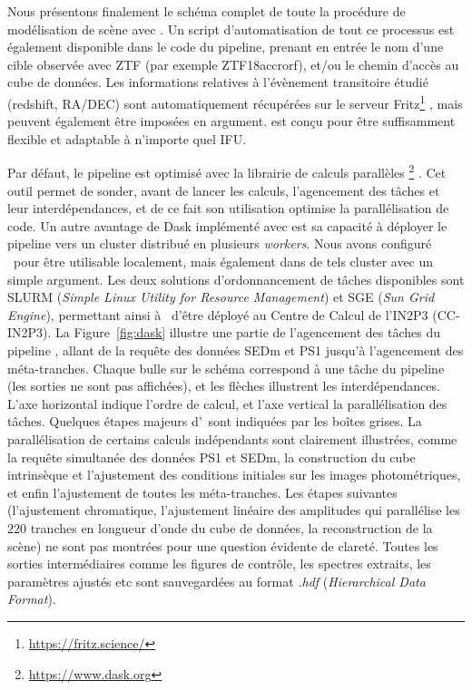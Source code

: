 \documentclass[../main/main.tex]{subfiles}
\begin{document}
Nous présentons finalement le schéma complet de toute la procédure de
modélisation de scène avec \hypergal. Un script d'automatisation de tout
ce processus est également disponible dans le code du pipeline, prenant
en entrée le nom d'une cible observée avec ZTF (par exemple
ZTF18accrorf), et/ou le chemin d'accès au cube de données. Les
informations relatives à l'évènement transitoire étudié (redshift, RA/DEC) sont
automatiquement récupérées sur le serveur
Fritz\footnote{\url{https://fritz.science/}} \citep{skyportal2019,
  duev2019real, Kasliwal_2019, Duev2021}, mais peuvent également être
imposées en argument. \hypergal est conçu pour être suffisamment
flexible et adaptable à n'importe quel IFU.

Par défaut, le pipeline est optimisé avec la librairie de calculs
parallèles \footnote{\url{https://www.dask.org}}
\citep{Dask}. Cet outil permet de sonder, avant de lancer les calculs, l'agencement des
tâches et leur interdépendances, et de ce fait son utilisation optimise la
parallélisation de code. Un autre avantage de Dask implémenté avec
\hypergal est sa capacité à déployer le pipeline vers un cluster
distribué en plusieurs \textit{workers}. Nous avons configuré \hypergal\
pour être utilisable localement, mais également dans de tels cluster
avec un simple argument. Les deux solutions d'ordonnancement de tâches
disponibles sont SLURM (\textit{Simple Linux Utility for Resource
  Management}) et SGE (\textit{Sun Grid Engine}), permettant ainsi à
\hypergal\ d'être déployé au Centre de Calcul de l'IN2P3 (CC-IN2P3). La
Figure~\ref{fig:dask} illustre une partie de l'agencement des tâches du
pipeline \hypergal, allant de la requête des données SEDm et PS1 jusqu'à
l'agencement des méta-tranches. Chaque bulle sur le schéma correspond à
une tâche du pipeline (les sorties ne sont pas affichées), et les flèches illustrent les
interdépendances. L'axe horizontal indique l'ordre de calcul, et l'axe
vertical la parallélisation des tâches. Quelques étapes majeurs
d'\hypergal\ sont indiquées par les boîtes grises. La parallélisation
de certains calculs indépendants sont clairement illustrées, comme la requête
simultanée des données PS1 et SEDm, la construction du cube intrinsèque
et l'ajustement des conditions initiales sur les images photométriques,
et enfin l'ajustement de toutes les méta-tranches. Les étapes suivantes
(l'ajustement
chromatique, l'ajustement linéaire des amplitudes qui parallélise les
$220$ tranches en longueur d'onde du cube de données, la reconstruction
de la scène) ne
sont pas montrées pour une question évidente de clareté. Toutes les
sorties intermédiaires comme les figures de contrôle, les spectres
extraits, les paramètres ajustés etc sont sauvegardées au format
\textit{.hdf} (\textit{Hierarchical Data Format}).
\end{document}
